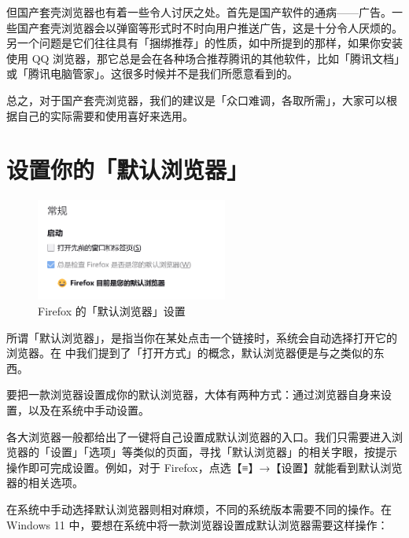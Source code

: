 但国产套壳浏览器也有着一些令人讨厌之处。首先是国产软件的通病——广告。一些国产套壳浏览器会以弹窗等形式时不时向用户推送广告，这是十分令人厌烦的。另一个问题是它们往往具有「捆绑推荐」的性质，如中所提到的那样，如果你安装使用 QQ 浏览器，那它总是会在各种场合推荐腾讯的其他软件，比如「腾讯文档」或「腾讯电脑管家」。这很多时候并不是我们所愿意看到的。

总之，对于国产套壳浏览器，我们的建议是「众口难调，各取所需」，大家可以根据自己的实际需要和使用喜好来选用。

\section{设置你的「默认浏览器」}

\begin{figure}
  \centering
  \vspace*{-.4cm}
  \includegraphics[width=6.3cm]{assets/software/Firefox_default_browser.png}
  \caption{Firefox 的「默认浏览器」设置}
  \label{fig:Firefox_default_browser}
\end{figure}

所谓「默认浏览器」，是指当你在某处点击一个链接时，系统会自动选择打开它的浏览器。在 中我们提到了「打开方式」的概念，默认浏览器便是与之类似的东西。

要把一款浏览器设置成你的默认浏览器，大体有两种方式：通过浏览器自身来设置，以及在系统中手动设置。

各大浏览器一般都给出了一键将自己设置成默认浏览器的入口。我们只需要进入浏览器的「设置」「选项」等类似的页面，寻找「默认浏览器」的相关字眼，按提示操作即可完成设置。例如，对于 Firefox，点选【≡】→【设置】就能看到默认浏览器的相关选项。

在系统中手动选择默认浏览器则相对麻烦，不同的系统版本需要不同的操作。在 Windows 11 中，要想在系统中将一款浏览器设置成默认浏览器需要这样操作：

